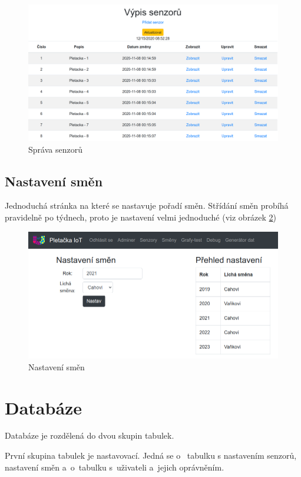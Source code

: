 \begin{figure}[htbp]
    \centering
    \includegraphics[width=\textwidth]{img/Edit.png}
    \caption{Správa senzorů}
    \label{fig:webSpravaSenzoru}
\end{figure}

\subsection{Nastavení směn}
Jednoduchá stránka na které se nastavuje pořadí směn.
Střídání směn probíhá pravidelně po týdnech, proto je nastavení velmi jednoduché (viz obrázek \ref{fig:webSmeny})

\begin{figure}[htbp]
    \centering
    \includegraphics[width=\textwidth]{img/smeny.png}
    \caption{Nastavení směn}
    \label{fig:webSmeny}
\end{figure}

\section{Databáze}
Databáze je rozdělená do dvou skupin tabulek.

První skupina tabulek je nastavovací.
Jedná se o ~tabulku s nastavením senzorů, nastavení směn a~o~tabulku s~uživateli a~jejich oprávněním.

